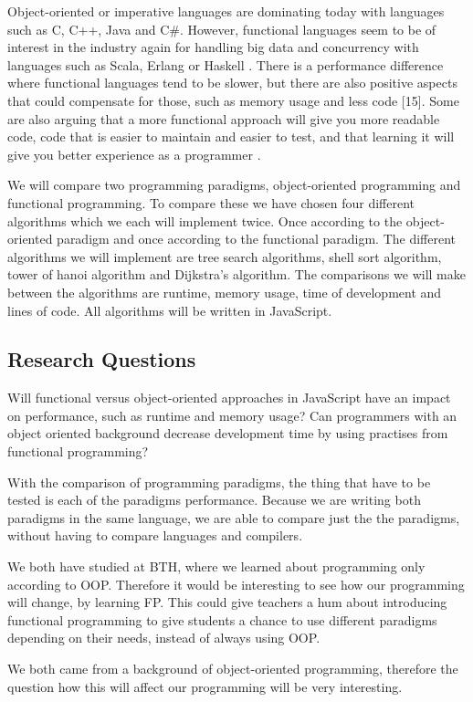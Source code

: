 \documentclass {article}
\begin{document}
Object-oriented or imperative languages are dominating today with languages such as C, C++, Java and C\#. However, functional languages seem to be of interest in the industry again for handling big data and concurrency with languages such as Scala, Erlang or Haskell \cite{drboolean, eriksen, erikarl}. There is a performance difference where functional languages tend to be slower, but there are also positive aspects that could compensate for those, such as memory usage and less code \cite{fogus} [15].  Some are also arguing that a more functional approach will give you more readable code, code that is easier to maintain and easier to test, and that learning it will give you better experience as a programmer \cite{drboolean, meijer}. 

We will compare two programming paradigms, object-oriented programming and functional programming. To compare these we have chosen four different algorithms which we each will implement twice. Once according to the object-oriented paradigm and once according to the functional paradigm. The different algorithms we will implement are tree search algorithms, shell sort algorithm, tower of hanoi algorithm and Dijkstra's algorithm. The comparisons we will make between the algorithms are runtime, memory usage, time of development and lines of code. All algorithms will be written in JavaScript.
\subsection{Research Questions}
Will functional versus object-oriented approaches in JavaScript have an impact on performance, such as runtime and memory usage?
Can programmers with an object oriented background decrease development time by using practises from functional programming?

With the comparison of programming paradigms, the thing that have to be tested is each of the paradigms performance. Because we are writing both paradigms in the same language, we are able to compare just the the paradigms, without having to compare languages and compilers.

We both have studied at BTH, where we learned about programming only according to OOP. Therefore it would be interesting to see how our programming will change, by learning FP. This could give teachers a hum about introducing functional programming to give students a chance to use different paradigms depending on their needs, instead of always using OOP.

We both came from a background of object-oriented programming, therefore 
the question how this will affect our programming will be very interesting. 
\end{document}

